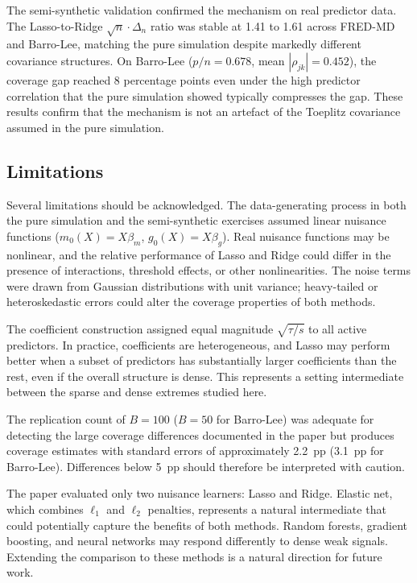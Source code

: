 \documentclass[a4paper,10.5pt]{article}
\begin{document}
The semi-synthetic validation confirmed the mechanism on real predictor data. The Lasso-to-Ridge $\sqrt{n}\cdot\Delta_n$ ratio was stable at 1.41 to 1.61 across FRED-MD and Barro-Lee, matching the pure simulation despite markedly different covariance structures. On Barro-Lee ($p/n = 0.678$, mean $|\rho_{jk}| = 0.452$), the coverage gap reached 8 percentage points even under the high predictor correlation that the pure simulation showed typically compresses the gap. These results confirm that the mechanism is not an artefact of the Toeplitz covariance assumed in the pure simulation.


\subsection*{Limitations}

Several limitations should be acknowledged. The data-generating process in both the pure simulation and the semi-synthetic exercises assumed linear nuisance functions ($m_0(X) = X\beta_m$, $g_0(X) = X\beta_g$). Real nuisance functions may be nonlinear, and the relative performance of Lasso and Ridge could differ in the presence of interactions, threshold effects, or other nonlinearities. The noise terms were drawn from Gaussian distributions with unit variance; heavy-tailed or heteroskedastic errors could alter the coverage properties of both methods.

The coefficient construction assigned equal magnitude $\sqrt{\tau/s}$ to all active predictors. In practice, coefficients are heterogeneous, and Lasso may perform better when a subset of predictors has substantially larger coefficients than the rest, even if the overall structure is dense. This represents a setting intermediate between the sparse and dense extremes studied here.

The replication count of $B = 100$ ($B = 50$ for Barro-Lee) was adequate for detecting the large coverage differences documented in the paper but produces coverage estimates with standard errors of approximately 2.2~pp (3.1~pp for Barro-Lee). Differences below 5~pp should therefore be interpreted with caution.

The paper evaluated only two nuisance learners: Lasso and Ridge. Elastic net, which combines $\ell_1$ and $\ell_2$ penalties, represents a natural intermediate that could potentially capture the benefits of both methods. Random forests, gradient boosting, and neural networks may respond differently to dense weak signals. Extending the comparison to these methods is a natural direction for future work.
\end{document}

